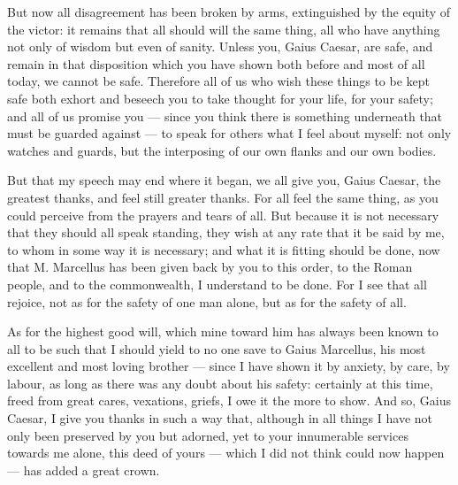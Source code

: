  But now all disagreement has been broken by arms, extinguished by the equity of the victor: it remains that all should will the same thing, all who have anything not only of wisdom but even of sanity. Unless you, Gaius Caesar, are safe, and remain in that disposition which you have shown both before and most of all today, we cannot be safe. Therefore all of us who wish these things to be kept safe both exhort and beseech you to take thought for your life, for your safety; and all of us promise you --- since you think there is something underneath that must be guarded against --- to speak for others what I feel about myself: not only watches and guards, but the interposing of our own flanks and our own bodies.

 But that my speech may end where it began, we all give you, Gaius Caesar, the greatest thanks, and feel still greater thanks. For all feel the same thing, as you could perceive from the prayers and tears of all. But because it is not necessary that they should all speak standing, they wish at any rate that it be said by me, to whom in some way it is necessary; and what it is fitting should be done, now that M. Marcellus has been given back by you to this order, to the Roman people, and to the commonwealth, I understand to be done. For I see that all rejoice, not as for the safety of one man alone, but as for the safety of all.

 As for the highest good will, which mine toward him has always been known to all to be such that I should yield to no one save to Gaius Marcellus, his most excellent and most loving brother --- since I have shown it by anxiety, by care, by labour, as long as there was any doubt about his safety: certainly at this time, freed from great cares, vexations, griefs, I owe it the more to show. And so, Gaius Caesar, I give you thanks in such a way that, although in all things I have not only been preserved by you but adorned, yet to your innumerable services towards me alone, this deed of yours --- which I did not think could now happen --- has added a great crown.
